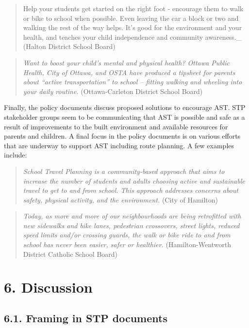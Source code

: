 \documentclass[]{elsarticle} %
\begin{document}
\begin{quote}
Help your students get started on the right foot - encourage them to
walk or bike to school when possible. Even leaving the car a block or
two and walking the rest of the way helps. It's good for the environment
and your health, and teaches your child independence and community
awareness.\_ (Halton District School Board)
\end{quote}

\begin{quote}
\emph{Want to boost your child's mental and physical health? Ottawa
Public Health, City of Ottawa, and OSTA have produced a tipsheet for
parents about ``active transportation'' to school -- fitting walking and
wheeling into your daily routine.} (Ottawa-Carleton District School
Board)
\end{quote}

Finally, the policy documents discuss proposed solutions to encourage
AST. STP stakeholder groups seem to be communicating that AST is
possible and safe as a result of improvements to the built environment
and available resources for parents and children. A final focus in the
policy documents is on various efforts that are underway to support AST
including route planning. A few examples include:

\begin{quote}
\emph{School Travel Planning is a community-based approach that aims to
increase the number of students and adults choosing active and
sustainable travel to get to and from school. This approach addresses
concerns about safety, physical activity, and the environment.} (City of
Hamilton)
\end{quote}

\begin{quote}
\emph{Today, as more and more of our neighbourhoods are being
retrofitted with new sidewalks and bike lanes, pedestrian crossovers,
street lights, reduced speed limits and/or crossing guards, the walk or
bike ride to and from school has never been easier, safer or healthier.}
(Hamilton-Wentworth District Catholic School Board)
\end{quote}

\hypertarget{discussion}{%
\section{6. Discussion}\label{discussion}}

\hypertarget{framing-in-stp-documents}{%
\subsection{6.1. Framing in STP
documents}\label{framing-in-stp-documents}}
\end{document}

